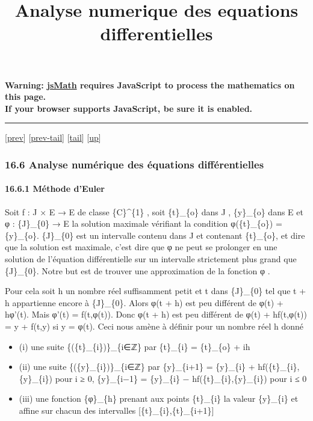 \documentclass[]{article}
\title{Analyse numerique des equations differentielles}
\author{}
\date{}
\begin{document}
\maketitle

\textbf{Warning: \href{http://www.math.union.edu/locate/jsMath}{jsMath}
requires JavaScript to process the mathematics on this page.\\ If your
browser supports JavaScript, be sure it is enabled.}

\begin{center}\rule{3in}{0.4pt}\end{center}

{[}\href{coursse90.html}{prev}{]}
{[}\href{coursse90.html\#tailcoursse90.html}{prev-tail}{]}
{[}\hyperref[tailcoursse91.html]{tail}{]}
{[}\href{coursch17.html\#coursse91.html}{up}{]}

\subsubsection{16.6 Analyse numérique des équations différentielles}

\paragraph{16.6.1 Méthode d'Euler}

Soit f : J × E → E de classe \{C\}\^{}\{1\} , soit \{t\}\_\{o\} dans J ,
\{y\}\_\{o\} dans E et φ : \{J\}\_\{0\} → E la solution maximale
vérifiant la condition φ(\{t\}\_\{o\}) = \{y\}\_\{o\}. \{J\}\_\{0\} est
un intervalle contenu dans J et contenant \{t\}\_\{o\}, et dire que la
solution est maximale, c'est dire que φ ne peut se prolonger en une
solution de l'équation différentielle sur un intervalle strictement plus
grand que \{J\}\_\{0\}. Notre but est de trouver une approximation de la
fonction φ .

Pour cela soit h un nombre réel suffisamment petit et t dans
\{J\}\_\{0\} tel que t + h appartienne encore à \{J\}\_\{0\}. Alors φ(t
+ h) est peu différent de φ(t) + hφ'(t). Mais φ'(t) = f(t,φ(t)). Donc
φ(t + h) est peu différent de φ(t) + hf(t,φ(t)) = y + f(t,y) si y =
φ(t). Ceci nous amène à définir pour un nombre réel h donné

\begin{itemize}
\itemsep1pt\parskip0pt
\item
  (i) une suite \{(\{t\}\_\{i\})\}\_\{i∈ℤ\} par \{t\}\_\{i\} =
  \{t\}\_\{o\} + ih
\item
  (ii) une suite \{(\{y\}\_\{i\})\}\_\{i∈ℤ\} par \{y\}\_\{i+1\} =
  \{y\}\_\{i\} + hf(\{t\}\_\{i\},\{y\}\_\{i\}) pour i ≥ 0,
  \{y\}\_\{i−1\} = \{y\}\_\{i\} − hf(\{t\}\_\{i\},\{y\}\_\{i\}) pour i ≤
  0
\item
  (iii) une fonction \{φ\}\_\{h\} prenant aux points \{t\}\_\{i\} la
  valeur \{y\}\_\{i\} et affine sur chacun des intervalles
  {[}\{t\}\_\{i\},\{t\}\_\{i+1\}{]}
\end{itemize}
\end{document}
